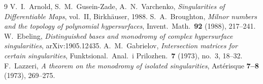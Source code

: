 \documentclass[11pt]{article}
\numberwithin{equation}{section}
\theoremstyle{definition}
\theoremstyle{remark}
\begin{document}
\begin{thebibliography}{9}
 V.~I.~Arnold, S.~M.~Gusein-Zade, A.~N.~Varchenko,
 \emph{Singularities of Differentiable Maps}, vol.~II, Birkh\"auser, 1988.
 S.~A.~Broughton, \emph{Milnor numbers and the topology of
 polynomial hypersurfaces}, Invent.\ Math.\ \textbf{92} (1988), 217--241.
 W.~Ebeling, \emph{Distinguished bases and monodromy of complex
 hypersurface singularities}, arXiv:1905.12435.
 A.~M.~Gabrielov, \emph{Intersection matrices for certain
 singularities}, Funktsional.\ Anal.\ i Prilozhen.\ \textbf{7} (1973), no.~3,
 18--32.
 F.~Lazzeri, \emph{A theorem on the monodromy of isolated
 singularities}, Ast\'erisque \textbf{7--8} (1973), 269--275.
\end{thebibliography}
\end{document}
